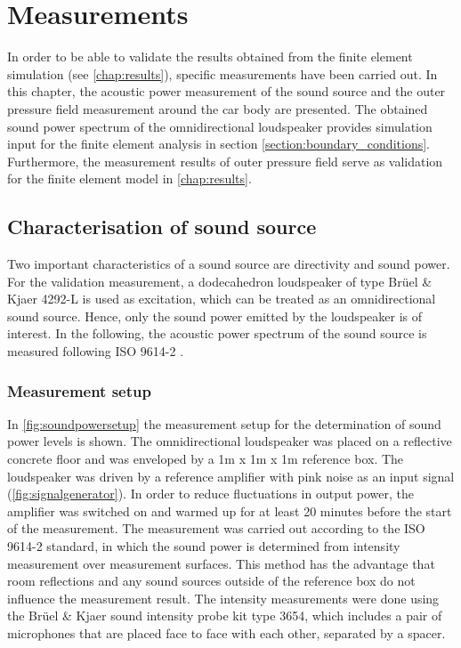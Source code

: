\chapter{Measurements}
\label{chap:measurement}

In order to be able to validate the results obtained from the finite element simulation (see \cref{chap:results}), specific measurements have been carried out.
In this chapter, the acoustic power measurement of the sound source and the outer pressure field measurement around the car body are presented.
The obtained sound power spectrum of the omnidirectional loudspeaker provides simulation input for the finite element analysis in section \ref{section:boundary_conditions}.
Furthermore, the measurement results of outer pressure field serve as validation for the finite element model in \cref{chap:results}.

\section{Characterisation of sound source}
\label{section:SWL_measurement}

Two important characteristics of a sound source are directivity and sound power. For the validation measurement, a dodecahedron loudspeaker of type Brüel \& Kjaer 4292-L is used as excitation, which can be treated as an omnidirectional sound source.
Hence, only the sound power emitted by the loudspeaker is of interest.
In the following, the acoustic power spectrum of the sound source is measured following ISO 9614-2 \cite{din19969614}.

\subsection*{Measurement setup}

In \cref{fig:soundpowersetup} the measurement setup for the determination of sound power levels is shown.
The omnidirectional loudspeaker was placed on a reflective concrete floor and was enveloped by a 1m x 1m x 1m reference box.
The loudspeaker was driven by a reference amplifier with pink noise as an input signal (\cref{fig:signalgenerator}).
In order to reduce fluctuations in output power, the amplifier was switched on and warmed up for at least 20 minutes before the start of the measurement.
The measurement was carried out according to the ISO 9614-2 standard, in which the sound power is determined from intensity measurement over measurement surfaces.
This method has the advantage that room reflections and any sound sources outside of the reference box do not influence the measurement result.
The intensity measurements were done using the Brüel \& Kjaer sound intensity probe kit type 3654, which includes a pair of microphones that are placed face to face with each other, separated by a spacer.

